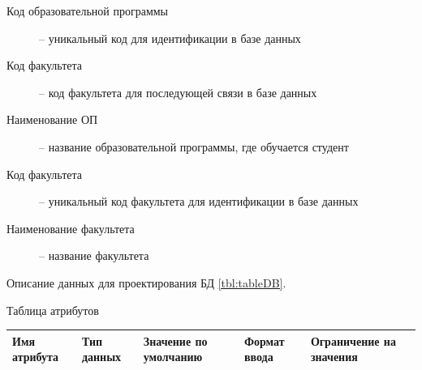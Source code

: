 \documentclass[PI,KR]{HSEUniversity}
\begin{document}
\begin{description}
	\item [Код образовательной программы] -- уникальный код для идентификации в базе данных
	\item [Код факультета] -- код факультета для последующей связи в базе данных
	\item [Наименование ОП] -- название образовательной программы, где обучается студент
	
	\item [Код факультета] -- уникальный код факультета для идентификации в базе данных
	\item [Наименование факультета] -- название факультета
\end{description} 
Описание данных для проектирования БД \ref{tbl:tableDB}.
\begin{TABLE}[!h]{Таблица атрибутов \label{tbl:tableDB}}
	\begin{tabular}[c]{|p{4cm}|l|p{3cm}|l|p{3cm}|}
		\hline
		Имя атрибута & Тип данных & Значение по умолчанию & Формат ввода & Ограничение на значения\\ \hline


\end{tabular}
\end{TABLE}
\end{document}
